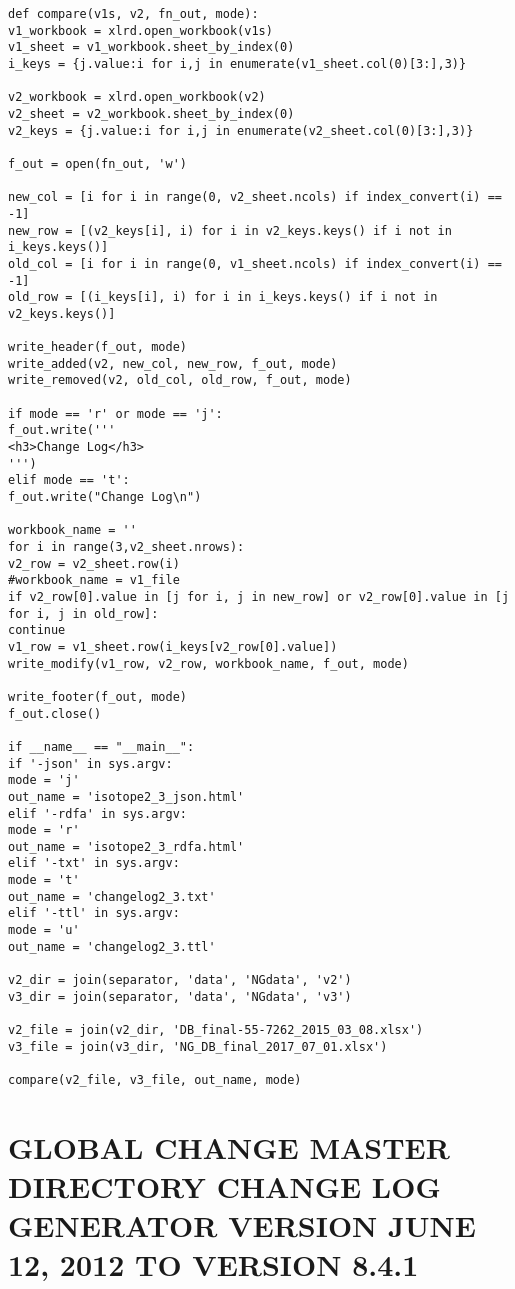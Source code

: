 \begin{verbatim}
def compare(v1s, v2, fn_out, mode):
v1_workbook = xlrd.open_workbook(v1s)
v1_sheet = v1_workbook.sheet_by_index(0)
i_keys = {j.value:i for i,j in enumerate(v1_sheet.col(0)[3:],3)}

v2_workbook = xlrd.open_workbook(v2)
v2_sheet = v2_workbook.sheet_by_index(0)
v2_keys = {j.value:i for i,j in enumerate(v2_sheet.col(0)[3:],3)}

f_out = open(fn_out, 'w')

new_col = [i for i in range(0, v2_sheet.ncols) if index_convert(i) == -1]
new_row = [(v2_keys[i], i) for i in v2_keys.keys() if i not in i_keys.keys()]
old_col = [i for i in range(0, v1_sheet.ncols) if index_convert(i) == -1]
old_row = [(i_keys[i], i) for i in i_keys.keys() if i not in v2_keys.keys()]

write_header(f_out, mode)
write_added(v2, new_col, new_row, f_out, mode)
write_removed(v2, old_col, old_row, f_out, mode)

if mode == 'r' or mode == 'j':
f_out.write('''
<h3>Change Log</h3>
''')
elif mode == 't':
f_out.write("Change Log\n")

workbook_name = ''
for i in range(3,v2_sheet.nrows):
v2_row = v2_sheet.row(i)
#workbook_name = v1_file
if v2_row[0].value in [j for i, j in new_row] or v2_row[0].value in [j for i, j in old_row]:
continue
v1_row = v1_sheet.row(i_keys[v2_row[0].value])
write_modify(v1_row, v2_row, workbook_name, f_out, mode)

write_footer(f_out, mode)
f_out.close()

if __name__ == "__main__":
if '-json' in sys.argv:
mode = 'j'
out_name = 'isotope2_3_json.html'
elif '-rdfa' in sys.argv:
mode = 'r'
out_name = 'isotope2_3_rdfa.html'
elif '-txt' in sys.argv:
mode = 't'
out_name = 'changelog2_3.txt'
elif '-ttl' in sys.argv:
mode = 'u'
out_name = 'changelog2_3.ttl'

v2_dir = join(separator, 'data', 'NGdata', 'v2')
v3_dir = join(separator, 'data', 'NGdata', 'v3')

v2_file = join(v2_dir, 'DB_final-55-7262_2015_03_08.xlsx')
v3_file = join(v3_dir, 'NG_DB_final_2017_07_01.xlsx')

compare(v2_file, v3_file, out_name, mode)
\end{verbatim}

\chapter{GLOBAL CHANGE MASTER DIRECTORY CHANGE LOG GENERATOR VERSION JUNE 12, 2012 TO VERSION 8.4.1}

